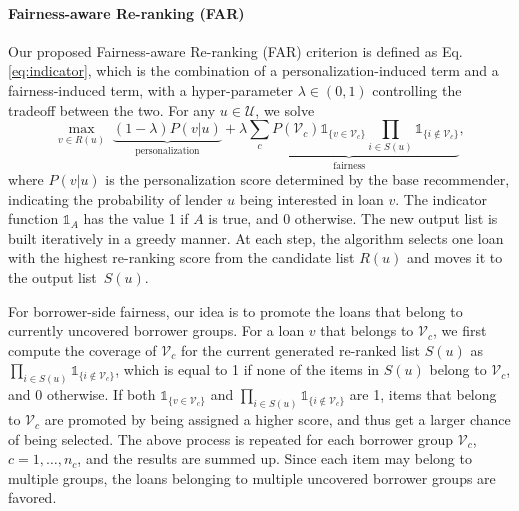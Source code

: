 \paragraph{\textbf{Fairness-aware Re-ranking (FAR)}}
Our proposed Fairness-aware Re-ranking (FAR) criterion is defined as Eq.\eqref{eq:indicator}, which is the combination of a personalization-induced term and a fairness-induced term, with a hyper-parameter $\lambda\in(0,1)$ controlling the tradeoff between the two. For any $u\in \mathcal U$, we solve
\begin{equation}
\max_{v\in R(u)}\;\underbrace{(1-\lambda)P(v|u)}_{\text{personalization}} + \underbrace{\lambda\sum_{c}P(\mathcal V_c)\mathds{1}_{\{v\in \mathcal V_c\}}\prod_{i\in S(u)}\mathds{1}_{\{i\notin \mathcal V_c\}}}_{\text{fairness}},%
\label{eq:indicator}
\end{equation}
where $P(v|u)$ is the personalization score determined by the base recommender, indicating the probability of lender $u$ being interested in loan $v$. The indicator function $\mathds{1}_{A}$ has the value 1 if $A$ is true, and 0 otherwise. The new output list is built iteratively in a greedy manner. At each step, the algorithm selects one loan with the highest re-ranking score from the candidate list $R(u)$ and moves it to the output list~$S(u)$.


For borrower-side fairness, our idea is to promote the loans that belong to currently uncovered borrower groups. For a loan $v$ that belongs to $\mathcal V_c$, we first compute the coverage of $\mathcal V_c$ for the current generated re-ranked list $S(u)$ as $\prod_{i\in S(u)}\mathds{1}_{\{i\notin \mathcal V_c\}}$, which is equal to 1 if none of the items in $S(u)$ belong to $\mathcal V_c$, and 0 otherwise. If both $\mathds{1}_{\{v\in \mathcal V_c\}}$ and $\prod_{i\in S(u)}\mathds{1}_{\{i\notin \mathcal V_c\}}$ are 1, items that belong to $\mathcal V_c$ are promoted by being assigned a higher score, and thus get a larger chance of being selected. The above process is repeated for each borrower group $\mathcal V_c$, $c={1,\ldots,n_c}$, and the results are summed up. Since each item may belong to multiple groups, the loans belonging to multiple uncovered borrower groups are favored. 

